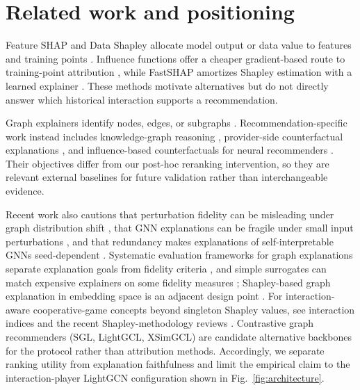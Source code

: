 \documentclass[pdflatex,sn-mathphys-num]{sn-jnl}
\begin{document}
\section{Related work and positioning}\label{sec:related_work}

Feature SHAP and Data Shapley allocate model output or data value to features and training points \cite{lundberg2017shap,ghorbani2019datashapley}. Influence functions offer a cheaper gradient-based route to training-point attribution \cite{koh2017influence}, while FastSHAP amortizes Shapley estimation with a learned explainer \cite{jethani2022fastshap}. These methods motivate alternatives but do not directly answer which historical interaction supports a recommendation.

Graph explainers identify nodes, edges, or subgraphs \cite{ying2019gnnexplainer,yuan2021explainability,duval2023graphsvx,zhang2022gstarx}. Recommendation-specific work instead includes knowledge-graph reasoning \cite{xian2019reinforcement}, provider-side counterfactual explanations \cite{ghazimatin2020prince}, and influence-based counterfactuals for neural recommenders \cite{tran2021counterfactual}. Their objectives differ from our post-hoc reranking intervention, so they are relevant external baselines for future validation rather than interchangeable evidence.

Recent work also cautions that perturbation fidelity can be misleading under graph distribution shift \cite{zheng2024robust,fang2023evaluating}, that GNN explanations can be fragile under small input perturbations \cite{li2024fragile}, and that redundancy makes explanations of self-interpretable GNNs seed-dependent \cite{tai2025redundancy}. Systematic evaluation frameworks for graph explanations separate explanation goals from fidelity criteria \cite{amara2022graphframex,agarwal2022probing}, and simple surrogates can match expensive explainers on some fidelity measures \cite{pereira2023distilnexplain}; Shapley-based graph explanation in embedding space is an adjacent design point \cite{ho2024shapleyembedding}. For interaction-aware cooperative-game concepts beyond singleton Shapley values, see interaction indices \cite{muschalik2024shapiq,schnake2022higher,myerson1977graphs} and the recent Shapley-methodology reviews \cite{li2024shapleyreview,markchom2025review}. Contrastive graph recommenders (SGL, LightGCL, XSimGCL) \cite{wu2021sgl,cai2023lightgcl,yu2024xsimgcl} are candidate alternative backbones for the protocol rather than attribution methods. Accordingly, we separate ranking utility from explanation faithfulness and limit the empirical claim to the interaction-player LightGCN configuration shown in Fig.~\ref{fig:architecture}.
\end{document}
